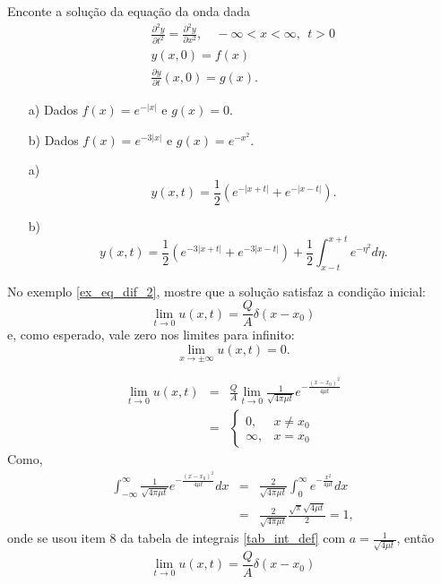 \begin{Exercise} Enconte a solução da equação da onda dada
\begin{eqnarray*}
&&\frac{\partial^2 y}{\partial t^2}=\frac{\partial^2
y}{\partial x^2},\quad -\infty<x<\infty,\ \ t>0\\
&&y(x,0)=f(x)\\
&&\frac{\partial y}{\partial t}(x,0)=g(x).
\end{eqnarray*}
\begin{itemize}
 \item[a)] Dados $f(x)=e^{-|x|}$ e $g(x)=0$.
  \item[b)] Dados $f(x)=e^{-3|x|}$ e $g(x)=e^{-x^2}$.
\end{itemize}

\end{Exercise}
\begin{Answer}

\begin{itemize}
 \item [a)] 
 \begin{equation*}
y(x,t)=\frac{1}{2} \left( e^{-|x+t|}+e^{-|x-t|}
\right).
\end{equation*}
\item [b)]
 \begin{equation*}
y(x,t)=\frac{1}{2} \left(  e^{-3|x+t|}+e^{-3|x-t|}
\right)+\frac{1}{2}\int_{x-t}^{x+t}e^{-\eta^2}d\eta.
\end{equation*}
\end{itemize}

\end{Answer}


\begin{Exercise}No exemplo \ref{ex_eq_dif_2}, mostre que a solução satisfaz a condição inicial: 
$$
\lim_{t\to 0}u(x,t)=\frac{Q}{A}\delta(x-x_0)
$$
e, como esperado, vale zero nos limites para infinito:
$$
\lim_{x\to\pm\infty}u(x,t)=0.
$$
\end{Exercise}
\begin{Answer}
\begin{eqnarray*}
\lim_{t\to 0} u(x,t)&=&\frac{Q}{A}\lim_{t\to 0} \frac{1}{\sqrt{4\pi \mu t}}e^{-\frac{(x-x_0)^2}{4\mu t}}\\
&=&\left\{\begin{array}{ll}0,&x\neq x_0\\ \infty, &x=x_0\end{array}\right.
\end{eqnarray*}
Como,
\begin{eqnarray*}
\int_{-\infty}^\infty\frac{1}{\sqrt{4\pi \mu t}}e^{-\frac{(x-x_0)^2}{4\mu t}}dx&=&\frac{2}{\sqrt{4\pi \mu t}}\int_{0}^\infty e^{-\frac{x^2}{4\mu t}}dx\\
&=&\frac{2}{\sqrt{4\pi \mu t}}\frac{\sqrt{\pi} \sqrt{4\mu t}}{2}=1,
\end{eqnarray*}
onde se usou item 8 da tabela de integrais \ref{tab_int_def} com $a=\frac{1}{\sqrt{4\mu t}}$, então
$$
\lim_{t\to 0} u(x,t)=\frac{Q}{A} \delta(x-x_0)
$$
\end{Answer}




